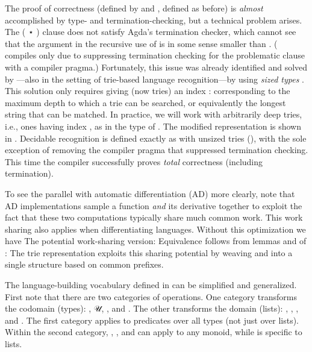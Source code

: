 \documentclass[acmsmall,screen,timestamp]{acmart}  %
\begin{document}
The proof of correctness (defined by {} and {}, defined as before) is \emph{almost} accomplished by type- and termination-checking, but a technical problem arises.
The { ( \AF ⋆ )} clause does not satisfy Agda's termination checker, which cannot see that the argument {  } in the recursive use of  is in some sense smaller than .
( compiles only due to suppressing termination checking for the problematic clause with a compiler pragma.)
Fortunately, this issue was already identified and solved by \citet{Abel2016}---also in the setting of trie-based language recognition---by using \emph{sized types} \citep{Abel2008, AbelPientka2016}.
\rnc{}
This solution only requires giving  (now tries) an index { \AK : } corresponding to the maximum depth to which a trie can be searched, or equivalently the longest string that can be matched.
In practice, we will work with arbitrarily deep tries, i.e., ones having index , as in the type of {}.
The modified representation is shown in .
Decidable recognition is defined exactly as with unsized tries (), with the sole exception of removing the compiler pragma that suppressed termination checking.
This time the compiler successfully proves \emph{total} correctness (including termination).

\rnc{}

To see the parallel with automatic differentiation (AD) more clearly, note that AD implementations sample a function \emph{and} its derivative together to exploit the fact that these two computations typically share much common work.
This work sharing also applies when differentiating languages.
Without this optimization we have
The potential work-sharing version:
Equivalence follows from lemmas  and  of :
The trie representation exploits this sharing potential by weaving  and  into a single structure based on common prefixes.


\rnc{}

The language-building vocabulary defined in  can be simplified and generalized.
First note that there are two categories of operations.
One category transforms the codomain (types): , \AF 𝒰, , and .
The other transforms the domain (lists): , , , and .
The first category applies to predicates over all types (not just over lists).
Within the second category, , , and  can apply to any monoid, while  is specific to lists.
\end{document}
